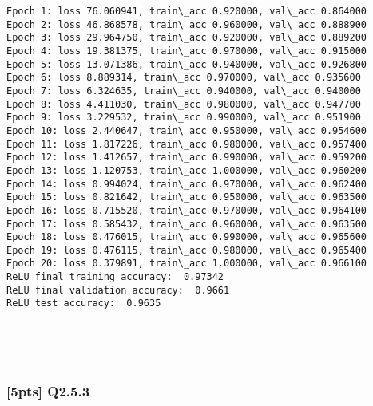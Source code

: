 \documentclass[11pt]{article}
\begin{document}
    \begin{Verbatim}[commandchars=\\\{\}]
Epoch 1: loss 76.060941, train\_acc 0.920000, val\_acc 0.864000
Epoch 2: loss 46.868578, train\_acc 0.960000, val\_acc 0.888900
Epoch 3: loss 29.964750, train\_acc 0.920000, val\_acc 0.889200
Epoch 4: loss 19.381375, train\_acc 0.970000, val\_acc 0.915000
Epoch 5: loss 13.071386, train\_acc 0.940000, val\_acc 0.926800
Epoch 6: loss 8.889314, train\_acc 0.970000, val\_acc 0.935600
Epoch 7: loss 6.324635, train\_acc 0.940000, val\_acc 0.940000
Epoch 8: loss 4.411030, train\_acc 0.980000, val\_acc 0.947700
Epoch 9: loss 3.229532, train\_acc 0.990000, val\_acc 0.951900
Epoch 10: loss 2.440647, train\_acc 0.950000, val\_acc 0.954600
Epoch 11: loss 1.817226, train\_acc 0.980000, val\_acc 0.957400
Epoch 12: loss 1.412657, train\_acc 0.990000, val\_acc 0.959200
Epoch 13: loss 1.120753, train\_acc 1.000000, val\_acc 0.960200
Epoch 14: loss 0.994024, train\_acc 0.970000, val\_acc 0.962400
Epoch 15: loss 0.821642, train\_acc 0.950000, val\_acc 0.963500
Epoch 16: loss 0.715520, train\_acc 0.970000, val\_acc 0.964100
Epoch 17: loss 0.585432, train\_acc 0.960000, val\_acc 0.963500
Epoch 18: loss 0.476015, train\_acc 0.990000, val\_acc 0.965600
Epoch 19: loss 0.476115, train\_acc 0.980000, val\_acc 0.965400
Epoch 20: loss 0.379891, train\_acc 1.000000, val\_acc 0.966100
ReLU final training accuracy:  0.97342
ReLU final validation accuracy:  0.9661
ReLU test accuracy:  0.9635

    \end{Verbatim}

    \begin{center}
    \end{center}
    { \hspace*{\fill} \\}
    
    \begin{center}
    \end{center}
    { \hspace*{\fill} \\}
    
    \hypertarget{pts-q2.5.3}{%
\subsubsection{{[}5pts{]} Q2.5.3}\label{pts-q2.5.3}}
\end{document}
